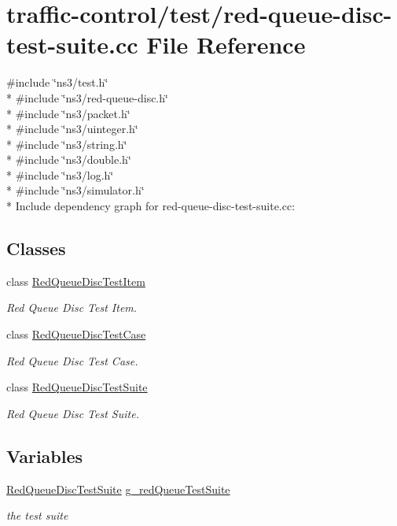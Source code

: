 \hypertarget{red-queue-disc-test-suite_8cc}{}\section{traffic-\/control/test/red-\/queue-\/disc-\/test-\/suite.cc File Reference}
\label{red-queue-disc-test-suite_8cc}
{\ttfamily \#include \char`\"{}ns3/test.\+h\char`\"{}}\\*
{\ttfamily \#include \char`\"{}ns3/red-\/queue-\/disc.\+h\char`\"{}}\\*
{\ttfamily \#include \char`\"{}ns3/packet.\+h\char`\"{}}\\*
{\ttfamily \#include \char`\"{}ns3/uinteger.\+h\char`\"{}}\\*
{\ttfamily \#include \char`\"{}ns3/string.\+h\char`\"{}}\\*
{\ttfamily \#include \char`\"{}ns3/double.\+h\char`\"{}}\\*
{\ttfamily \#include \char`\"{}ns3/log.\+h\char`\"{}}\\*
{\ttfamily \#include \char`\"{}ns3/simulator.\+h\char`\"{}}\\*
Include dependency graph for red-\/queue-\/disc-\/test-\/suite.cc\+:
\subsection*{Classes}
\begin{DoxyCompactItemize}
\item 
class \hyperlink{classRedQueueDiscTestItem}{Red\+Queue\+Disc\+Test\+Item}
\begin{DoxyCompactList}\small\item\em Red Queue Disc Test Item. \end{DoxyCompactList}\item 
class \hyperlink{classRedQueueDiscTestCase}{Red\+Queue\+Disc\+Test\+Case}
\begin{DoxyCompactList}\small\item\em Red Queue Disc Test Case. \end{DoxyCompactList}\item 
class \hyperlink{classRedQueueDiscTestSuite}{Red\+Queue\+Disc\+Test\+Suite}
\begin{DoxyCompactList}\small\item\em Red Queue Disc Test Suite. \end{DoxyCompactList}\end{DoxyCompactItemize}
\subsection*{Variables}
\begin{DoxyCompactItemize}
\item 
\hyperlink{classRedQueueDiscTestSuite}{Red\+Queue\+Disc\+Test\+Suite} \hyperlink{group__traffic-control-test_ga6d67a0d8c95097fe204536a2f38f96b3}{g\+\_\+red\+Queue\+Test\+Suite}
\begin{DoxyCompactList}\small\item\em the test suite \end{DoxyCompactList}\end{DoxyCompactItemize}

